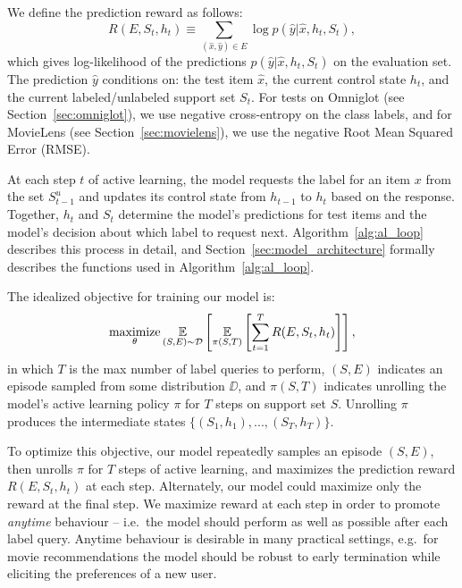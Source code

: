 We define the prediction reward as follows:
\begin{equation}
R(E, S_t, h_t) \equiv \sum_{(\hat x, \hat y) \in E} \log p(\hat y | \hat x, h_t, S_t),
\label{eq:task_reward_general}
\end{equation}
which gives log-likelihood of the predictions $p(\hat y | \hat x, h_t, S_t)$ on the evaluation set. The prediction $\hat{y}$ conditions on: the test item $\hat{x}$, the current control state $h_t$, and the current labeled/unlabeled support set $S_t$. For tests on Omniglot (see Section~\ref{sec:omniglot}), we use negative cross-entropy on the class labels, and for MovieLens (see Section~\ref{sec:movielens}), we use the negative Root Mean Squared Error (RMSE).

At each step $t$ of active learning, the model requests the label for an item $x$ from the set $S^u_{t-1}$ and updates its control state from $h_{t-1}$ to $h_t$ based on the response.
Together, $h_t$ and $S_t$ determine the model's predictions for test items and the model's decision about which label to request next.
Algorithm~\ref{alg:al_loop} describes this process in detail, and Section~\ref{sec:model_architecture} formally describes the functions used in Algorithm~\ref{alg:al_loop}.


The idealized objective for training our model is:
\begin{equation}
\operatorname*{maximize}_{\theta} \operatorname*{\mathbb{E}}_{(S, E) \sim \mathcal{D}} \left[ \operatorname*{\mathbb{E}}_{\pi(S, T)} \left[ \sum_{t=1}^{T} R(E, S_t, h_t) \right] \right],
\label{eq:task_obj_general}
\end{equation}
in which $T$ is the max number of label queries to perform, $(S, E)$ indicates an episode sampled from some distribution $\DD$, and $\pi(S, T)$ indicates unrolling the model's active learning policy $\pi$ for $T$ steps on support set $S$. Unrolling $\pi$ produces the intermediate states $\{(S_1, h_1), ..., (S_T, h_T)\}$.

To optimize this objective, our model repeatedly samples an episode $(S, E)$, then unrolls $\pi$ for $T$ steps of active learning, and maximizes the prediction reward $R(E, S_t, h_t)$ at each step.
Alternately, our model could maximize only the reward at the final step.
We maximize reward at each step in order to promote \emph{anytime} behaviour -- i.e.~the model should perform as well as possible after each label query.
Anytime behaviour is desirable in many practical settings, e.g.~for movie recommendations the model should be robust to early termination while eliciting the preferences of a new user.

